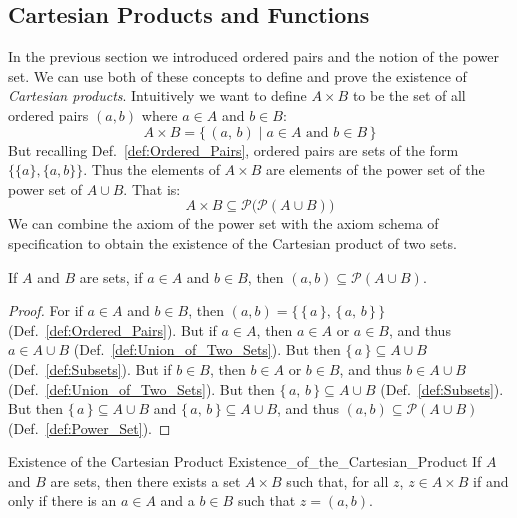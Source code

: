     \subsection{Cartesian Products and Functions}
        In the previous section we introduced ordered pairs and the notion of
        the power set. We can use both of these concepts to define and prove
        the existence of \textit{Cartesian products}. Intuitively we want to
        define $A\times{B}$ to be the set of all ordered pairs $(a,b)$ where
        $a\in{A}$ and $b\in{B}$:
        \begin{equation}
            A\times{B}=\big\{\,(a,\,b)\;|\;a\in{A}\textrm{ and }b\in{B}\,\big\}
        \end{equation}
        But recalling Def.~\ref{def:Ordered_Pairs}, ordered pairs are sets
        of the form $\{\{a\},\{a,b\}\}$. Thus the elements of
        $A\times{B}$ are elements of the power set of the power set of
        $A\cup{B}$. That is:
        \begin{equation}
            A\times{B}\subseteq\mathcal{P}\big(\mathcal{P}(A\cup{B})\big)
        \end{equation}
        We can combine the axiom of the power set with the axiom schema of
        specification to obtain the existence of the Cartesian product of
        two sets.
        \begin{theorem}
            \label{thm:Ordered_Pair_Subset_of_Power_Set}%
            If $A$ and $B$ are sets, if $a\in{A}$ and $b\in{B}$, then
            $(a,b)\subseteq\mathcal{P}(A\cup{B})$.
        \end{theorem}
        \begin{proof}
            For if $a\in{A}$ and $b\in{B}$, then
            $(a,b)=\{\,\{\,a\,\},\,\{\,a,\,b\,\}\,\}$
            (Def.~\ref{def:Ordered_Pairs}). But if $a\in{A}$, then $a\in{A}$
            or $a\in{B}$, and thus $a\in{A}\cup{B}$
            (Def.~\ref{def:Union_of_Two_Sets}). But then
            $\{\,a\,\}\subseteq{A}\cup{B}$ (Def.~\ref{def:Subsets}). But if
            $b\in{B}$, then $b\in{A}$ or $b\in{B}$, and thus $b\in{A}\cup{B}$
            (Def.~\ref{def:Union_of_Two_Sets}). But then
            $\{\,a,\,b\,\}\subseteq{A}\cup{B}$ (Def.~\ref{def:Subsets}).
            But then $\{\,a\,\}\subseteq{A}\cup{B}$ and
            $\{\,a,\,b\,\}\subseteq{A}\cup{B}$, and thus
            $(a,b)\subseteq\mathcal{P}(A\cup{B})$ (Def.~\ref{def:Power_Set}).
        \end{proof}
        \begin{ltheorem}{Existence of the Cartesian Product}
                        {Existence_of_the_Cartesian_Product}
            If $A$ and $B$ are sets, then there exists a set $A\times{B}$
            such that, for all $z$, $z\in{A}\times{B}$ if and only if there
            is an $a\in{A}$ and a $b\in{B}$ such that $z=(a,b)$.
        \end{ltheorem}

